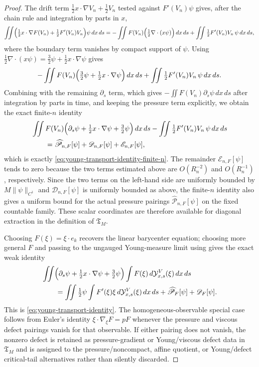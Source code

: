 \documentclass[11pt]{amsart}
\numberwithin{equation}{section}
\theoremstyle{plain}
\theoremstyle{definition}
\theoremstyle{remark}
\newcommand{\Tcrit}{\mathfrak T_M}
\begin{document}
\begin{proof}
The drift term \(\tfrac12 x\cdot\nabla V_n+\tfrac12 V_n\) tested against
\(F'(V_n)\psi\) gives, after the chain rule and integration by parts in
\(x\),
\[
   \iint\Bigl(\tfrac12 x\cdot\nabla F(V_n)+\tfrac12 F'(V_n)V_n\Bigr)\psi\,dx\,ds
   =-\iint F(V_n)\Bigl(\tfrac12\nabla\cdot(x\psi)\Bigr)\,dx\,ds
   +\iint \tfrac12 F'(V_n)V_n\,\psi\,dx\,ds ,
\]
where the boundary term vanishes by compact support of \(\psi\).  Using
\(\tfrac12\nabla\cdot(x\psi)=\tfrac32\psi+\tfrac12 x\cdot\nabla\psi\) gives
\[
   -\iint F(V_n)
   \Bigl(\tfrac32\psi+\tfrac12 x\cdot\nabla\psi\Bigr)\,dx\,ds
   +\iint \tfrac12 F'(V_n)V_n\,\psi\,dx\,ds .
\]
Combining with the remaining \(\partial_s\) term, which gives
\(-\iint F(V_n)\partial_s\psi\,dx\,ds\) after integration by parts in time,
and keeping the pressure term explicitly, we obtain the exact finite-\(n\)
identity
\[
\begin{aligned}
   &\iint
   F(V_n)
   \Bigl(\partial_s\psi+\tfrac12 x\cdot\nabla\psi+\tfrac32\psi\Bigr)\,dx\,ds
   -\iint \tfrac12 F'(V_n)V_n\,\psi\,dx\,ds \\
   &\qquad =
   \widehat{\mathscr P}_{n,F}[\psi]
   +\mathscr D_{n,F}[\psi]+\mathscr E_{n,F}[\psi],
\end{aligned}
\]
which is exactly \eqref{eq:young-transport-identity-finite-n}.  The remainder
\(\mathscr E_{n,F}[\psi]\) tends to zero because the two terms estimated above
are \(O(R_n^{-2})\) and \(O(R_n^{-1})\), respectively.  Since the two terms on
the left-hand side are uniformly bounded by \(M\|\psi\|_{C^1}\) and
\(\mathscr D_{n,F}[\psi]\) is uniformly bounded as above, the finite-\(n\)
identity also gives a uniform bound for the actual pressure pairings
\(\widehat{\mathscr P}_{n,F}[\psi]\) on the fixed countable family.  These scalar
coordinates are therefore available for diagonal extraction in the definition of
\(\Tcrit\).

Choosing \(F(\xi)=\xi\cdot e_k\) recovers the linear barycenter equation;
choosing more general \(F\) and passing to the ungauged Young-measure limit using
 gives the exact weak identity
\[
\begin{aligned}
   &\iint
   \Bigl(\partial_s\psi+\tfrac12 x\cdot\nabla\psi+\tfrac32\psi\Bigr)
   \int F(\xi)\,d\mathcal Y^V_{x,s}(\xi)\,dx\,ds\\
   &\qquad =
   \iint \tfrac12 \psi
   \int F'(\xi)\xi\,d\mathcal Y^V_{x,s}(\xi)\,dx\,ds
   +\widehat{\mathscr P}_F[\psi]+\mathscr D_F[\psi].
\end{aligned}
\]
This is \eqref{eq:young-transport-identity}.  The homogeneous-observable
special case follows from Euler's identity
\(\xi\cdot\nabla_\xi F=pF\) whenever the pressure and viscous defect pairings
vanish for that observable.  If either pairing does not vanish, the nonzero
defect is retained as pressure-gradient or Young/viscous defect data in
\(\Tcrit\) and is assigned to the pressure/noncompact, affine quotient, or
Young/defect critical-tail alternatives rather than silently discarded.


\end{proof}
\end{document}
